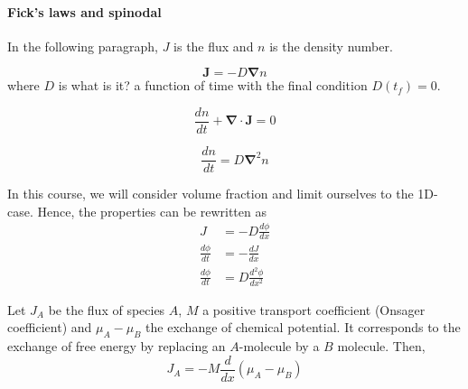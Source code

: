 \documentclass[../phys-f308.tex]{subfiles}
\begin{document}
    \paragraph{Fick's laws and spinodal}
    In the following paragraph, $J$ is the flux and $n$ is the density number.

    \begin{property}
        \begin{equation}
            \bm{J} = -D\bm{\nabla}n
        \end{equation}
        where $D$ is \color{red}what is it?\color{black} a function of time with the final condition $D(t_f) = 0$.
    \end{property}
    
    \begin{property}
        \begin{equation}
            \frac{dn}{dt}+\bm{\nabla}\cdot\bm{J} = 0
        \end{equation}
    \end{property}

    \begin{property}
        \begin{equation}
            \frac{dn}{dt} = D\bm{\nabla}^2n
        \end{equation}
    \end{property}
    In this course, we will consider volume fraction and limit ourselves to the 1D-case. Hence, the properties can be rewritten as
    \begin{align}
        J &= -D\frac{d\phi}{dx}\\
        \frac{d\phi}{dt} &= -\frac{dJ}{dx}\label{eq: useful}\\
        \frac{d\phi}{dt} &= D\frac{d^2\phi}{dx^2}
    \end{align}

    \begin{property}
        Let $J_A$ be the flux of species $A$, $M$ a positive transport coefficient (Onsager coefficient) and $\mu_A - \mu_B$ the exchange of chemical potential. It corresponds to the exchange of free energy by replacing an $A$-molecule by a $B$ molecule. Then,
        \begin{equation}
            J_A = -M\frac{d}{dx}\left(\mu_A-\mu_B\right)\label{eq: modified diffusion}
        \end{equation}
    \end{property}
\end{document}
